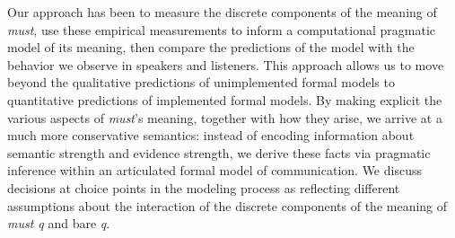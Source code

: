 \documentclass[11pt]{article}
\newcommand{\red}[1]{\textcolor{Red}{#1}}
\begin{document}
Our approach has been to measure the discrete components of the meaning of \emph{must}, use these empirical measurements to inform a computational pragmatic model of its meaning, then compare the predictions of the model with the behavior we observe in speakers and listeners. This approach allows us to move beyond the qualitative predictions of unimplemented formal models to quantitative predictions of implemented formal models. By making explicit the various aspects of \emph{must}'s meaning, together with how they arise, we arrive at a much more conservative semantics: instead of encoding information about semantic strength and evidence strength, we derive these facts via pragmatic inference within an articulated formal model of communication. We discuss decisions at choice points in the modeling process as reflecting different assumptions about the interaction of the discrete components of the meaning of \emph{must q} and bare \emph{q}.


\vspace{-1.5em}
%
\small


\end{document}
